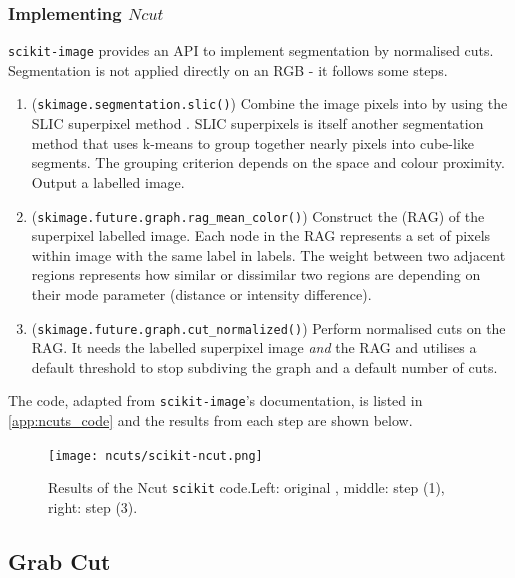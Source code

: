 \documentclass[a4paper]{article}
\begin{document}
\subsubsection{Implementing $Ncut$}

\texttt{scikit-image} provides an API to implement segmentation by normalised cuts. Segmentation is not applied directly on an RGB - it follows some steps.
\begin{enumerate}
    \item (\texttt{skimage.segmentation.slic()}) Combine the image pixels into  by using the SLIC superpixel method \TODO[ref]. SLIC superpixels is itself another segmentation method that uses k-means to group together nearly pixels into cube-like segments. The grouping criterion depends on the space and colour proximity. Output a labelled image.
    \item (\texttt{skimage.future.graph.rag_mean_color()}) Construct the  (RAG) of the superpixel labelled image. Each node in the RAG represents a set of pixels within image with the same label in labels. The weight between two adjacent regions represents how similar or dissimilar two regions are depending on their mode parameter (distance or intensity difference). 
    \item (\texttt{skimage.future.graph.cut_normalized()}) Perform normalised cuts on the RAG. It needs the labelled superpixel image \textit{and} the RAG and utilises a default threshold to stop subdiving the graph and a default number of cuts. 
\end{enumerate}
\marginnote{\faCogs \ref{app:ncuts_code}\faCogs}
The code, adapted from \texttt{scikit-image}'s documentation, is listed in \ref{app:ncuts_code} and the results from each step are shown below.
\begin{figure}[H]
	\centering %
    	\texttt{[image: ncuts/scikit-ncut.png]}
    \caption{Results of the Ncut \texttt{scikit} code.Left: original , middle: step (1), right: step (3).}
\end{figure}


\subsection{Grab Cut}
\end{document}
